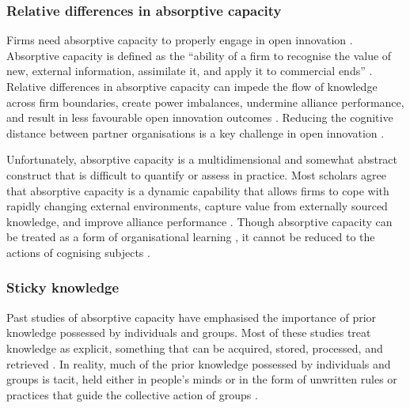 \subsubsection{Relative differences in absorptive capacity}

Firms need absorptive capacity to properly engage in open innovation \citep{vanhaverbeke2007connecting}. Absorptive capacity is defined as the \enquote{ability of a firm to recognise the value of new, external information, assimilate it, and apply it to commercial ends} \citep{cohen1990absorptive}. Relative differences in absorptive capacity can impede the flow of knowledge across firm boundaries, create power imbalances, undermine alliance performance, and result in less favourable open innovation outcomes \citep{szulanski1996exploring,lane1998relative,nooteboom2000learning,vanhaverbeke2007connecting,easterby2008absorptive,phelps2012knowledge}. Reducing the cognitive distance between partner organisations is a key challenge in open innovation \citep{nooteboom2000learning,vanhaverbeke2007connecting}. 

Unfortunately, absorptive capacity is a multidimensional and somewhat abstract construct that is difficult to quantify or assess in practice. Most scholars agree that absorptive capacity is a dynamic capability that allows firms to cope with rapidly changing external environments, capture value from externally sourced knowledge, and improve alliance performance \citep{omidvar2013revisiting}. Though absorptive capacity can be treated as a form of organisational learning \citep{cohen1989innovation,easterby2008absorptive,sun2010examination}, it cannot be reduced to the actions of cognising subjects \citep{omidvar2013revisiting,turner2013absorptive,marabelli2014knowing}.

\subsubsection{Sticky knowledge}

Past studies of absorptive capacity have emphasised the importance of prior knowledge possessed by individuals and groups. Most of these studies treat knowledge as explicit, something that can be acquired, stored, processed, and retrieved \citep{omidvar2013revisiting,marabelli2014knowing}. In reality, much of the prior knowledge possessed by individuals and groups is tacit, held either in people's minds or in the form of unwritten rules or practices that guide the collective action of groups \citep{mowery1996strategic,leonard1998role,burt2007secondhand,goksel2016can,lichtenthaler2016absorptive}. \medskip


